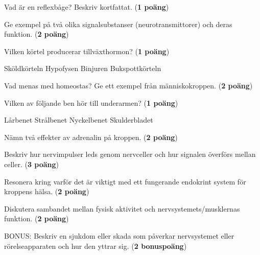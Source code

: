 \documentclass{exam}
\begin{document}
\begin{questions}
\vspace{5mm}

\question Vad är en reflexbåge? Beskriv kortfattat. (\textbf{1 poäng})
\vspace{20mm}

\question Ge exempel på två olika signalsubstanser (neurotransmittorer) och deras funktion. (\textbf{2 poäng})
\vspace{20mm}

\question Vilken körtel producerar tillväxthormon? (\textbf{1 poäng})
\begin{checkboxes}
    \choice Sköldkörteln
    \choice Hypofysen
    \choice Binjuren
    \choice Bukspottkörteln
\end{checkboxes}

\vspace{5mm}

\question Vad menas med homeostas? Ge ett exempel från människokroppen. (\textbf{2 poäng})
\vspace{20mm}

\question Vilken av följande ben hör till underarmen? (\textbf{1 poäng})
\begin{checkboxes}
    \choice Lårbenet
    \choice Strålbenet
    \choice Nyckelbenet
    \choice Skulderbladet
\end{checkboxes}

\vspace{5mm}

\question Nämn två effekter av adrenalin på kroppen. (\textbf{2 poäng})
\vspace{20mm}

\break
{}

\question Beskriv hur nervimpulser leds genom nervceller och hur signalen överförs mellan celler. (\textbf{3 poäng})
\vspace{40mm}

\question Resonera kring varför det är viktigt med ett fungerande endokrint system för kroppens hälsa. (\textbf{2 poäng})
\vspace{30mm}

\question Diskutera sambandet mellan fysisk aktivitet och nervsystemets/musklernas funktion. (\textbf{2 poäng})
\vspace{30mm}

\question BONUS: Beskriv en sjukdom eller skada som påverkar nervsystemet eller rörelseapparaten och hur den yttrar sig. (\textbf{2 bonuspoäng})
\vspace{30mm}

\end{questions}
\end{document}

